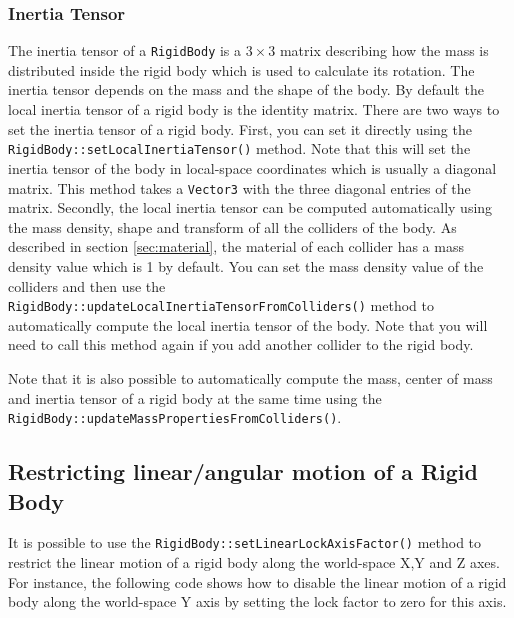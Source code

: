 \documentclass[a4paper,12pt]{article}
\begin{document}
    \subsubsection{Inertia Tensor}

    \begin{sloppypar}
    The inertia tensor of a \texttt{RigidBody} is a $3 \times 3$ matrix describing how the mass is distributed inside the rigid body which is
    used to calculate its rotation. The inertia tensor depends on the mass and the shape of the body. By default the local inertia tensor of a rigid body
    is the identity matrix. There are two ways to set the inertia tensor of
    a rigid body. First, you can set it directly using the \texttt{RigidBody::setLocalInertiaTensor()} method. Note that this will set the inertia tensor
    of the body in local-space coordinates which is usually a diagonal matrix. This method takes a \texttt{Vector3} with the three diagonal entries of the
    matrix. Secondly, the local inertia tensor can be computed automatically using the mass density, shape and transform of all the colliders of the body.
    As described in section \ref{sec:material}, the material of each collider has a mass density value which is 1 by default. You can set the mass density
    value of the colliders and then use the \texttt{RigidBody::updateLocalInertiaTensorFromColliders()} method to automatically compute the local inertia
    tensor of the body. Note that you will need to call this method again if you add another collider to the rigid body.
    \end{sloppypar}

    \vspace{0.6cm}

    \begin{sloppypar}
    Note that it is also possible to automatically compute the mass, center of mass and inertia tensor of a rigid body at the same time using the
    \texttt{RigidBody::updateMassPropertiesFromColliders()}.
    \end{sloppypar}

    \subsection{Restricting linear/angular motion of a Rigid Body}

    It is possible to use the \texttt{RigidBody::setLinearLockAxisFactor()} method to restrict the linear motion of a rigid body along the world-space
    X,Y and Z axes. For instance, the following code shows how to disable the linear motion of a rigid body along the world-space Y axis by setting the lock
    factor to zero for this axis. \\
\end{document}
